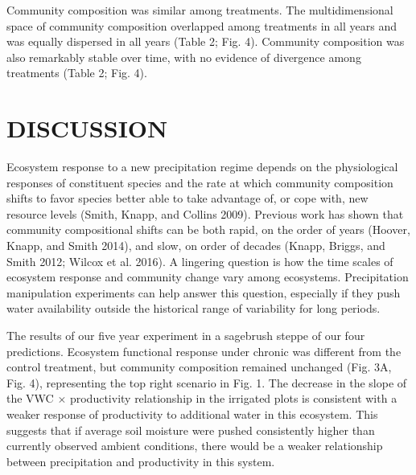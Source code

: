 \documentclass[fleqn,10pt,lineno]{wlpeerj} %
\begin{document}
Community composition was similar among treatments. The multidimensional
space of community composition overlapped among treatments in all years
and was equally dispersed in all years (Table 2; Fig. 4). Community
composition was also remarkably stable over time, with no evidence of
divergence among treatments (Table 2; Fig. 4).

\hypertarget{discussion}{%
\section{DISCUSSION}\label{discussion}}

Ecosystem response to a new precipitation regime depends on the
physiological responses of constituent species and the rate at which
community composition shifts to favor species better able to take
advantage of, or cope with, new resource levels (Smith, Knapp, and
Collins 2009). Previous work has shown that community compositional
shifts can be both rapid, on the order of years (Hoover, Knapp, and
Smith 2014), and slow, on order of decades (Knapp, Briggs, and Smith
2012; Wilcox et al. 2016). A lingering question is how the time scales
of ecosystem response and community change vary among ecosystems.
Precipitation manipulation experiments can help answer this question,
especially if they push water availability outside the historical range
of variability for long periods.

The results of our five year experiment in a sagebrush steppe
 of our four predictions. Ecosystem functional
response under chronic  was different from
the control treatment, but community composition remained unchanged
(Fig. 3A, Fig. 4), representing the top right scenario in Fig. 1. The
decrease in the slope of the VWC \(\times\) productivity relationship in
the irrigated plots is consistent with a weaker response of productivity
to additional water in this ecosystem. This suggests that if average
soil moisture were pushed consistently higher than currently observed
ambient conditions, there would be a weaker relationship between
precipitation and productivity in this system.
\end{document}
